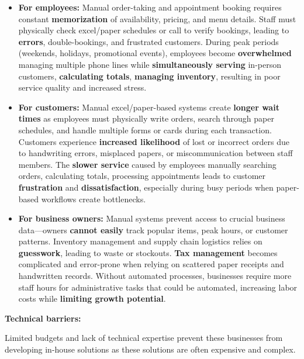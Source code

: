 \documentclass[]{VUMIFTemplateClass}
\newcommand{\todocomment}[1]{%
    \begin{tcolorbox}[colback=red!20, colframe=red!60, arc=0pt, outer arc=0pt, boxrule=1pt, left=3pt, right=3pt, top=3pt, bottom=3pt]
        \textbf{\textcolor{orange!70!black}{TODO:}} #1
    \end{tcolorbox}
}
\begin{document}
\begin{itemize}
    \item \textbf{For employees:} Manual order-taking and appointment booking
    requires constant \textbf{memorization} of availability, pricing, and menu
    details. Staff must physically check excel/paper schedules or call to verify
    bookings, leading to \textbf{errors}, double-bookings, and frustrated
    customers. During peak periods (weekends, holidays, promotional events),
    employees become \textbf{overwhelmed} managing multiple phone lines while
    \textbf{simultaneously serving} in-person customers, \textbf{calculating
    totals}, \textbf{managing inventory}, resulting in poor service quality and
    increased stress.

    \item \textbf{For customers:} Manual excel/paper-based systems create
    \textbf{longer wait times} as employees must physically write orders, search
    through paper schedules, and handle multiple forms or cards during each
    transaction. Customers experience \textbf{increased likelihood} of lost or
    incorrect orders due to handwriting errors, misplaced papers, or
    miscommunication between staff members. The \textbf{slower service} caused
    by employees manually searching orders, calculating totals, processing
    appointments leads to customer \textbf{frustration} and
    \textbf{dissatisfaction}, especially during busy periods when paper-based
    workflows create bottlenecks.

    \item \textbf{For business owners:} Manual systems prevent access to crucial
    business data—owners \textbf{cannot easily} track popular items, peak hours,
    or customer patterns. Inventory management and supply chain logistics relies
    on \textbf{guesswork}, leading to waste or stockouts. \textbf{Tax
    management} becomes complicated and error-prone when relying on scattered
    paper receipts and handwritten records. Without automated processes,
    businesses require more staff hours for administrative tasks that could be
    automated, increasing labor costs while \textbf{limiting growth potential}.
\end{itemize}

\textbf{Technical barriers:}

Limited budgets and lack of technical expertise prevent these businesses from
developing in-house solutions as these solutions are often expensive and complex.
\end{document}
